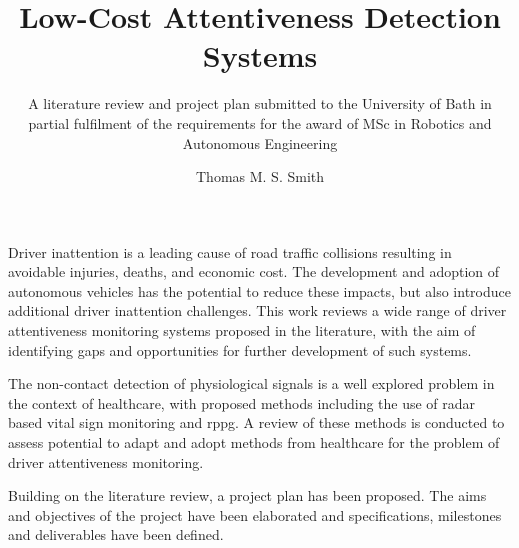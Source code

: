 \documentclass[11pt, parskip=half*,twoside=false]{scrbook}
\title{Low-Cost Attentiveness Detection Systems}
\author{Thomas M. S. Smith}
\subtitle{A literature review and project plan submitted to the University of Bath in partial fulfilment of the requirements for the award of MSc in Robotics and Autonomous Engineering}
\begin{document}
\maketitle

\frontmatter


%
%



Driver inattention is a leading cause of road traffic collisions resulting in avoidable injuries, deaths, and economic cost.
The development and adoption of autonomous vehicles has the potential to reduce these impacts, but also introduce additional driver inattention challenges. This work reviews a wide range of driver attentiveness monitoring systems proposed in the literature, with the aim of identifying gaps and opportunities for further development of such systems.

The non-contact detection of physiological signals is a well explored problem in the context of healthcare, with proposed methods including the use of radar based vital sign monitoring and \glsdesc{rppg}. A review of these methods is conducted to assess potential to adapt and adopt methods from healthcare for the problem of driver attentiveness monitoring.

Building on the literature review, a project plan has been proposed. The aims and objectives of the project have been elaborated and specifications, milestones and deliverables have been defined.

\tableofcontents
\end{document}
